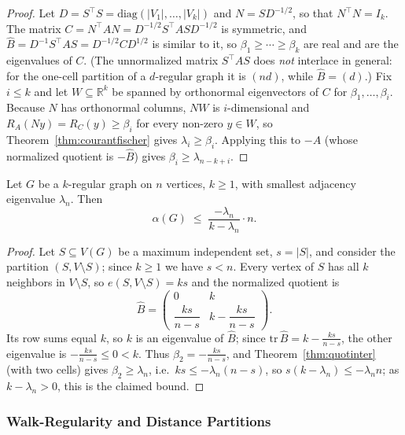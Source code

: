 \begin{proof}
Let $D = S^\top S = \mathrm{diag}(|V_1|, \ldots, |V_k|)$ and
$N = S D^{-1/2}$, so that $N^\top N = I_k$. The matrix
$C = N^\top A N = D^{-1/2} S^\top A S D^{-1/2}$ is symmetric, and
$\hat B = D^{-1} S^\top A S = D^{-1/2} C D^{1/2}$ is similar to it, so
$\beta_1 \ge \cdots \ge \beta_k$ are real and are the eigenvalues of
$C$. (The unnormalized matrix $S^\top A S$ does \emph{not} interlace in
general: for the one-cell partition of a $d$-regular graph it is
$(nd)$, while $\hat B = (d)$.) Fix $i \le k$ and let $W \subseteq
\mathbb R^k$ be spanned by orthonormal eigenvectors of $C$ for
$\beta_1, \ldots, \beta_i$. Because $N$ has orthonormal columns, $NW$ is
$i$-dimensional and $R_A(Ny) = R_C(y) \ge \beta_i$ for every non-zero
$y \in W$, so Theorem~\ref{thm:courantfischer} gives
$\lambda_i \ge \beta_i$. Applying this to $-A$ (whose normalized
quotient is $-\hat B$) gives $\beta_i \ge \lambda_{n - k + i}$.
\end{proof}

\begin{corollary}\label{cor:haemers}
Let $G$ be a $k$-regular graph on $n$ vertices, $k \ge 1$, with smallest
adjacency eigenvalue $\lambda_n$. Then
\[
  \alpha(G) \;\le\; \frac{-\lambda_n}{k - \lambda_n} \cdot n.
\]
\end{corollary}

\begin{proof}
Let $S \subseteq V(G)$ be a maximum independent set, $s = |S|$, and
consider the partition $(S, V \setminus S)$; since $k \ge 1$ we have
$s < n$. Every vertex of $S$ has all $k$ neighbors in $V \setminus S$,
so $e(S, V \setminus S) = ks$ and the normalized quotient is
\[
  \hat B = \begin{pmatrix} 0 & k \\[2pt] \dfrac{ks}{n - s} & k - \dfrac{ks}{n - s} \end{pmatrix}.
\]
Its row sums equal $k$, so $k$ is an eigenvalue of $\hat B$; since
$\mathrm{tr}\, \hat B = k - \frac{ks}{n - s}$, the other eigenvalue is
$-\frac{ks}{n - s} \le 0 < k$. Thus $\beta_2 = -\frac{ks}{n - s}$, and
Theorem~\ref{thm:quotinter} (with two cells) gives $\beta_2 \ge \lambda_n$,
i.e.\ $ks \le -\lambda_n (n - s)$, so $s(k - \lambda_n) \le -\lambda_n n$;
as $k - \lambda_n > 0$, this is the claimed bound.
\end{proof}

\subsubsection{Walk-Regularity and Distance Partitions}

